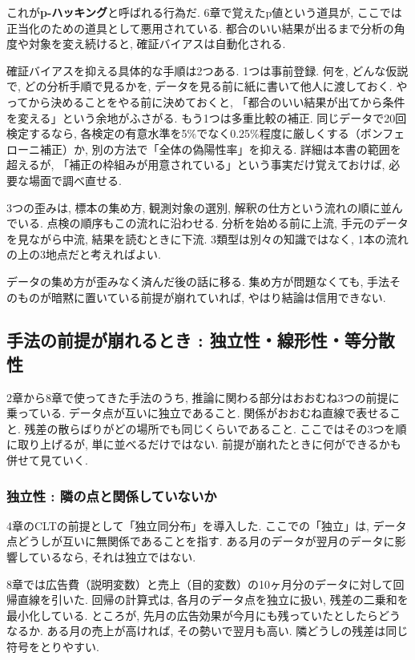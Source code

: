 これが\textbf{p-ハッキング}と呼ばれる行為だ.
6章で覚えたp値という道具が, ここでは正当化のための道具として悪用されている.
都合のいい結果が出るまで分析の角度や対象を変え続けると, 確証バイアスは自動化される.

確証バイアスを抑える具体的な手順は2つある.
1つは事前登録. 何を, どんな仮説で, どの分析手順で見るかを, データを見る前に紙に書いて他人に渡しておく.
やってから決めることをやる前に決めておくと, 「都合のいい結果が出てから条件を変える」という余地がふさがる.
もう1つは多重比較の補正. 同じデータで20回検定するなら, 各検定の有意水準を5\%でなく0.25\%程度に厳しくする（ボンフェローニ補正）か, 別の方法で「全体の偽陽性率」を抑える.
詳細は本書の範囲を超えるが, 「補正の枠組みが用意されている」という事実だけ覚えておけば, 必要な場面で調べ直せる.

3つの歪みは, 標本の集め方, 観測対象の選別, 解釈の仕方という流れの順に並んでいる. 点検の順序もこの流れに沿わせる.
分析を始める前に上流, 手元のデータを見ながら中流, 結果を読むときに下流.
3類型は別々の知識ではなく, 1本の流れの上の3地点だと考えればよい.

データの集め方が歪みなく済んだ後の話に移る. 集め方が問題なくても, 手法そのものが暗黙に置いている前提が崩れていれば, やはり結論は信用できない.


\subsection{手法の前提が崩れるとき : 独立性・線形性・等分散性}

2章から8章で使ってきた手法のうち, 推論に関わる部分はおおむね3つの前提に乗っている.
データ点が互いに独立であること. 関係がおおむね直線で表せること. 残差の散らばりがどの場所でも同じくらいであること.
ここではその3つを順に取り上げるが, 単に並べるだけではない. 前提が崩れたときに何ができるかも併せて見ていく.

\subsubsection*{独立性 : 隣の点と関係していないか}

4章のCLTの前提として「独立同分布」を導入した.
ここでの「独立」は, データ点どうしが互いに無関係であることを指す.
ある月のデータが翌月のデータに影響しているなら, それは独立ではない.

8章では広告費（説明変数）と売上（目的変数）の10ヶ月分のデータに対して回帰直線を引いた.
回帰の計算式は, 各月のデータ点を独立に扱い, 残差の二乗和を最小化している.
ところが, 先月の広告効果が今月にも残っていたとしたらどうなるか.
ある月の売上が高ければ, その勢いで翌月も高い. 隣どうしの残差は同じ符号をとりやすい.

